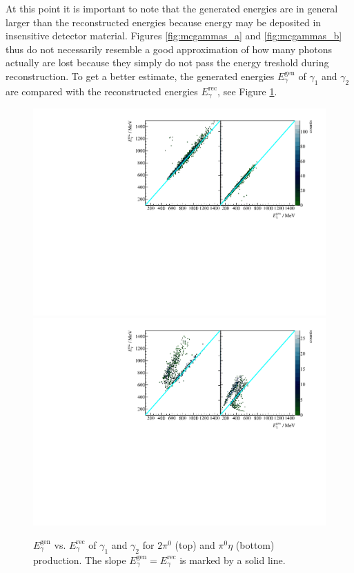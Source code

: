  At this point it is important to note that the generated energies are in general larger than the reconstructed energies because energy may be deposited in insensitive detector material. Figures \ref{fig:mcgammas_a} and \ref{fig:mcgammas_b} thus do not necessarily resemble a good approximation of how many photons actually are lost because they simply do not pass the energy treshold during reconstruction. To get a better estimate, the generated energies $E_\gamma^\text{gen}$ of $\gamma_1$ and $\gamma_2$ are compared with the reconstructed energies $E_\gamma^\text{rec}$, see Figure \ref{fig:mcgenvsrec}. 
  \begin{figure}[htbp]
	\includegraphics[width=\linewidth]{../figs/hydrogen/2pi0_gammas.pdf}
	\includegraphics[width=\linewidth]{../figs/hydrogen/pi0eta_gammas.pdf}
 	\caption{$E_\gamma^\text{gen}$ vs. $E_\gamma^\text{rec}$ of $\gamma_1$ and $\gamma_2$ for $2\pi^0$ (top) and $\pi^0\eta$ (bottom) production. The slope $E_\gamma^\text{gen}=E_\gamma^\text{rec}$ is marked by a solid line.}
 	\label{fig:mcgenvsrec}
 \end{figure}
